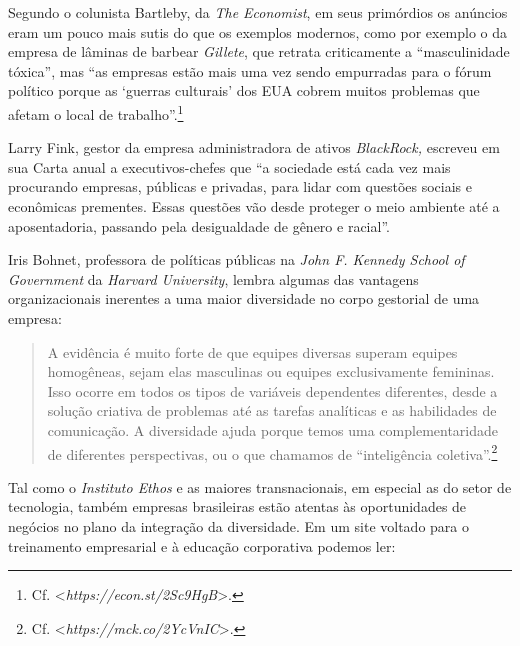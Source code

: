 Segundo o colunista Bartleby, da \emph{The Economist}, em seus
primórdios os anúncios eram um pouco mais sutis do que os exemplos
modernos, como por exemplo o da empresa de lâminas de barbear
\emph{Gillete}, que retrata criticamente a ``masculinidade tóxica'', mas
``as empresas estão mais uma vez sendo empurradas para o fórum político
porque as `guerras culturais' dos EUA cobrem muitos problemas que afetam
o local de trabalho''.\footnote{Cf. \textless{}\emph{https://econ.st/2Sc9HgB}\textgreater{}.}

Larry Fink, gestor da empresa administradora de ativos \emph{BlackRock,}
escreveu em sua Carta anual a executivos-chefes que ``a sociedade está
cada vez mais procurando empresas, públicas e privadas, para lidar com
questões sociais e econômicas prementes. Essas questões vão desde
proteger o meio ambiente até a aposentadoria, passando pela desigualdade
de gênero e racial''.

Iris Bohnet, professora de políticas públicas na \emph{John F. Kennedy
School of Government} da \emph{Harvard University}, lembra algumas das
vantagens organizacionais inerentes a uma maior diversidade no corpo
gestorial de uma empresa:

\begin{quote}
A evidência é muito forte de que equipes diversas superam equipes
homogêneas, sejam elas masculinas ou equipes exclusivamente femininas.
Isso ocorre em todos os tipos de variáveis dependentes diferentes, desde
a solução criativa de problemas até as tarefas analíticas e as
habilidades de comunicação. A diversidade ajuda porque temos uma
complementaridade de diferentes perspectivas, ou o que chamamos de
``inteligência coletiva''.\footnote{Cf. \textless{}\emph{https://mck.co/2YcVnIC}\textgreater{}.}
\end{quote}

Tal como o \emph{Instituto Ethos} e as maiores transnacionais, em
especial as do setor de tecnologia, também empresas brasileiras estão
atentas às oportunidades de negócios no plano da integração da
diversidade. Em um site voltado para o treinamento empresarial e à
educação corporativa podemos ler:


